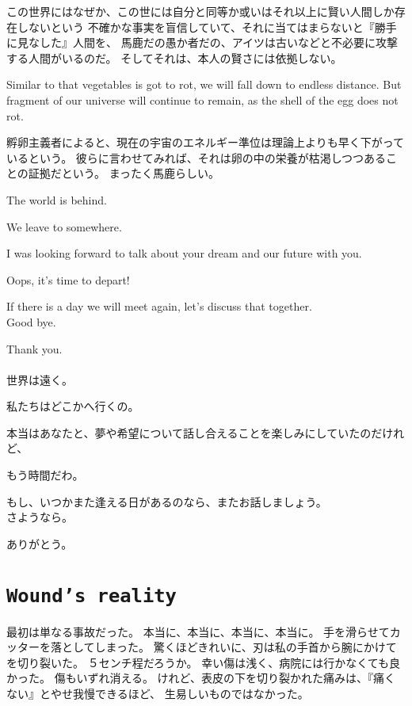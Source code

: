\documentclass[autodetect-engine,dvipdfmx-if-dvi,a5paper,ja=standard,twoside,titlepage,final,twocolumn]{ltjtbook}
\begin{document}
この世界にはなぜか、この世には自分と同等か或いはそれ以上に賢い人間しか存在しないという
不確かな事実を盲信していて、それに当てはまらないと『勝手に見なした』人間を、
馬鹿だの愚か者だの、アイツは古いなどと不必要に攻撃する人間がいるのだ。
そしてそれは、本人の賢さには依拠しない。

Similar to that vegetables is got to rot, we will fall down to endless distance.
But fragment of our universe will continue to remain, as the shell of the egg does not rot.

孵卵主義者によると、現在の宇宙のエネルギー準位は理論上よりも早く下がっているという。
彼らに言わせてみれば、それは卵の中の栄養が枯渇しつつあることの証拠だという。
まったく馬鹿らしい。

\newpage
\onecolumn

The world is behind.

We leave to somewhere.

I was looking forward to talk about your dream and our future with you.

Oops, it's time to depart!

If there is a day we will meet again, let's discuss that together.\\

Good bye.

Thank you.\\

\\

世界は遠く。

私たちはどこかへ行くの。

本当はあなたと、夢や希望について話し合えることを楽しみにしていたのだけれど、

もう時間だわ。

もし、いつかまた逢える日があるのなら、またお話しましょう。\\

さようなら。

ありがとう。

\newpage
\tate
\twocolumn
\section*{\tt Wound's reality}
最初は単なる事故だった。
本当に、本当に、本当に、本当に。
手を滑らせてカッターを落としてしまった。
驚くほどきれいに、刃は私の手首から腕にかけてを切り裂いた。
５センチ程だろうか。
幸い傷は浅く、病院には行かなくても良かった。
傷もいずれ消える。
けれど、表皮の下を切り裂かれた痛みは、『痛くない』とやせ我慢できるほど、
生易しいものではなかった。
\end{document}
